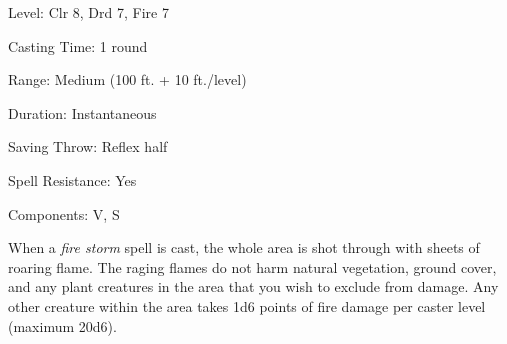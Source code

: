 
\begin{description*}
\item[Level:] Clr 8, Drd 7, Fire 7
\item[Casting Time:] 1 round
\item[Range:] Medium (100 ft. + 10 ft./level)
\item[Duration:] Instantaneous
\item[Saving Throw:] Reflex half
\item[Spell Resistance:] Yes
\item[Components:] V, S
\end{description*}

When a \textit{fire storm} spell is cast, the whole area is shot through with sheets
of roaring flame. The raging flames do not harm natural vegetation, ground cover,
and any plant creatures in the area that you wish to exclude from damage. Any other
creature within the area takes 1d6 points of fire damage per caster level (maximum
20d6).